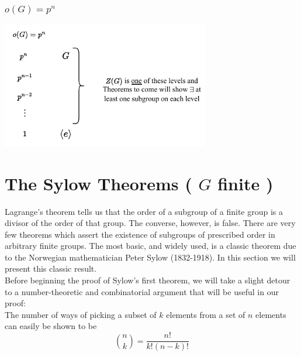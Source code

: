 \subsubsection*{$o(G)=p^n$}
\begin{center}
    \includegraphics[width=0.68\textwidth]{Figures/prime_power_order_lattice.pdf}
\end{center}

\section{\texorpdfstring{The Sylow Theorems ( $G$ finite )}{The Sylow Theorems ( G finite )}}
Lagrange's theorem tells us that the order of a subgroup of a finite group is a divisor of the order of that group. The converse, however, is false. There are very few theorems which assert the existence of subgroups of prescribed order in arbitrary finite groups. The most basic, and widely used, is a classic theorem due to the Norwegian mathematician Peter Sylow (1832-1918).
In this section we will present this classic result. \steezybreak\\

\noindent Before beginning the proof of Sylow's first theorem, we will take a slight detour to a number-theoretic and combinatorial argument that will be useful in our proof: \steezybreak\\
The number of ways of picking a subset of $k$ elements from a set of $n$ elements can easily be shown to be 
\begin{equation}
    {n \choose k} = {\frac{n!}{k!(n-k)!}} \nonumber
\end{equation}

